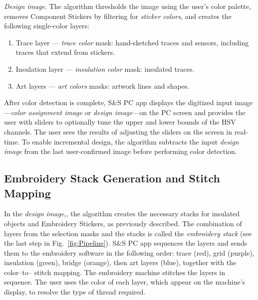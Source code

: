 \textit{Design image}. The algorithm thresholds the image using the user's color palette, removes Component Stickers by filtering for \textit{sticker colors}, and creates the following single-color layers:
\begin{enumerate}
\itemsep-0.2em 
    \item Trace layer --- \textit{trace color} mask: hand-sketched traces and sensors, including traces that extend from stickers. %
    \item Insulation layer --- \textit{insulation color} mask: insulated traces.
    \item Art layers --- \textit{art colors} masks: artwork lines and shapes.
\end{enumerate}
 

After color detection is complete, S\&S PC app displays the digitized input image---\textit{color assignment image} or \textit{design image}---on the PC screen and provides the user with sliders to optionally tune the upper and lower bounds of the HSV channels. The user sees the results of adjusting the sliders on the screen in real-time. %
To enable incremental design, the algorithm subtracts the input \textit{design image} from the last user-confirmed image before performing color detection.

\subsection{Embroidery Stack Generation and Stitch Mapping}
In the \textit{design image,}, the algorithm creates the necessary stacks for insulated objects and Embroidery Stickers, as previously described. The combination of layers from the selection masks and the stacks is called the \textit{embroidery stack} (see the last step in Fig.\ \ref{fig:Pipeline}). S\&S PC app sequences the layers and sends them to the embroidery software in the following order: trace (red), grid (purple), insulation (green), bridge (orange), then art layers (blue), together with the  color--to-- stitch mapping. The embroidery machine stitches the layers in sequence. The user uses the color of each layer, which appear on the machine's display, to resolve the type of thread required.


